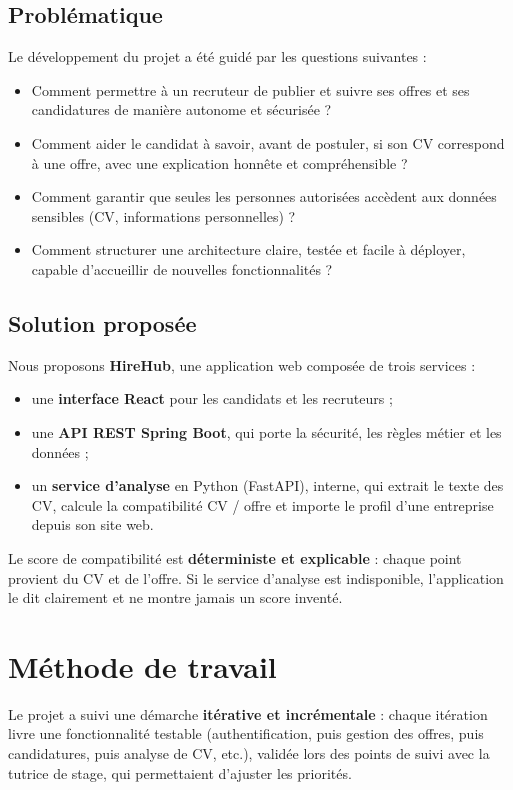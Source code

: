 \documentclass[12pt,a4paper]{report}
\begin{document}
\subsection{Problématique}
Le développement du projet a été guidé par les questions suivantes :
\begin{itemize}
  \item Comment permettre à un recruteur de publier et suivre ses offres et ses candidatures de manière autonome et sécurisée ?
  \item Comment aider le candidat à savoir, avant de postuler, si son CV correspond à une offre, avec une explication honnête et compréhensible ?
  \item Comment garantir que seules les personnes autorisées accèdent aux données sensibles (CV, informations personnelles) ?
  \item Comment structurer une architecture claire, testée et facile à déployer, capable d'accueillir de nouvelles fonctionnalités ?
\end{itemize}

\subsection{Solution proposée}
Nous proposons \textbf{HireHub}, une application web composée de trois services :
\begin{itemize}
  \item une \textbf{interface React} pour les candidats et les recruteurs ;
  \item une \textbf{API REST Spring Boot}, qui porte la sécurité, les règles métier et les données ;
  \item un \textbf{service d'analyse} en Python (FastAPI), interne, qui extrait le texte des CV, calcule la compatibilité CV / offre et importe le profil d'une entreprise depuis son site web.
\end{itemize}
Le score de compatibilité est \textbf{déterministe et explicable} : chaque point provient du CV et de l'offre. Si le service d'analyse est indisponible, l'application le dit clairement et ne montre jamais un score inventé.

\section{Méthode de travail}
Le projet a suivi une démarche \textbf{itérative et incrémentale} : chaque itération livre une fonctionnalité testable (authentification, puis gestion des offres, puis candidatures, puis analyse de CV, etc.), validée lors des points de suivi avec la tutrice de stage, qui permettaient d'ajuster les priorités.
\end{document}

